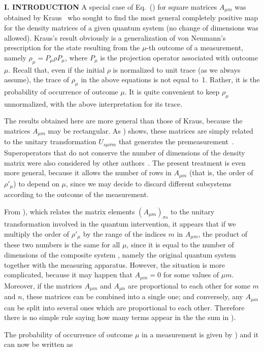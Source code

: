 \begin{center}{\bf I. INTRODUCTION}
A special case of Eq.~(\theequation) for square matrices $A_{\mu m}$
was obtained by Kraus~\cite{Kraus} who sought to find the most general
completely positive map for the density matrices of a given quantum
system (no change of dimensions was allowed). Kraus's result obviously
is a generalization of von Neumann's prescription for the state
resulting from the $\mu$-th outcome of a measurement, namely
$\rho_\mu=P_\mu\rho P_\mu$, where $P_\mu$ is the projection operator
associated with outcome $\mu$. Recall that, even if the initial $\rho$
is normalized to unit trace (as we always assume), the trace of
$\rho_\mu$ in the above equations is not equal to~1. Rather, it is the
probability of occurrence of outcome $\mu$. It is quite convenient to
keep $\rho_\mu$ unnormalized, with the above interpretation for its
trace.

The results obtained here are more general than those of Kraus, because
the matrices $A_{\mu m}$ may be rectangular. As ) shows, these
matrices are simply related to the unitary transformation $U_{s\mu\sigma
m}$ that generates the premeasurement~\cite{ben}. Super\-operators that
do not conserve the number of dimensions of the density matrix were also
considered by other authors~\cite{Ben}. The present treatment is even
more general, because it allows the number of rows in $A_{\mu m}$ (that
is, the order of $\rho'_\mu$) to depend on $\mu$, since we may decide to
discard different subsystems according to the outcome of the
measurement. 

{}From ), which relates the matrix elements $(A_{\mu m})_{\sigma
s}$ to the unitary transformation involved in the quantum intervention,
it appears that if we multiply the order of $\rho'_\mu$ by the range
of the indices $m$ in $A_{\mu m}$, the product of these two numbers is
the same for all $\mu$, since it is equal to the number of dimensions of
the composite system \cC, namely the original quantum system together
with the measuring apparatus. However, the situation is more
complicated, because it may happen that $A_{\mu m}=0$ for some values of
$\mu m$. Moreover, if the matrices $A_{\mu m}$ and $A_{\mu n}$ are
proportional to each other for some $m$ and $n$, these matrices can be
combined into a single one; and conversely, any $A_{\mu m}$ can be split
into several ones which are proportional to each other. Therefore there
is no simple rule saying how many terms appear in the the sum in
).

The probability of occurrence of outcome $\mu$ in a measurement is given
by ) and it can now be written as


\end{center}
